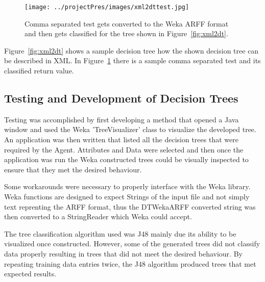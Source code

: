 \begin{figure}[h!]
  \centering  
  \texttt{[image: ../projectPres/images/xml2dttest.jpg]}
  \caption{Comma separated test gets converted to the Weka ARFF format and then gets classified for 
  the tree shown in Figure~\ref{fig:xml2dt}.}
  \label{fig:xml2dttest}
\end{figure}

Figure~\ref{fig:xml2dt} shows a sample decision tree how the shown decision tree can be described in XML.  
In Figure~\ref{fig:xml2dttest} there is a sample comma separated test and its classified return value.

\subsection{Testing and Development of Decision Trees}
Testing was accomplished by first developing a method that opened a Java window and used the Weka
'TreeVisualizer' class to visualize the developed tree.  An application was then written that listed
all the decision trees that were required by the Agent.  Attributes and Data were selected and then 
once the application was run the Weka constructed trees could be visually inspected to ensure that
they met the desired behaviour.

Some workarounds were necessary to properly interface with the Weka library.  Weka functions are
designed to expect Strings of the input file and not simply text reprenting the ARFF format, thus
the DTWekaARFF converted string was then converted to a StringReader which Weka could accept.

The tree classification algorithm used was J48 mainly due its ability to be visualized once constructed.
However, some of the generated trees did not classify data properly resulting in trees that did not
meet the desired behaviour.  By repeating training data entries twice, the J48 algorithm produced
trees that met expected results. 